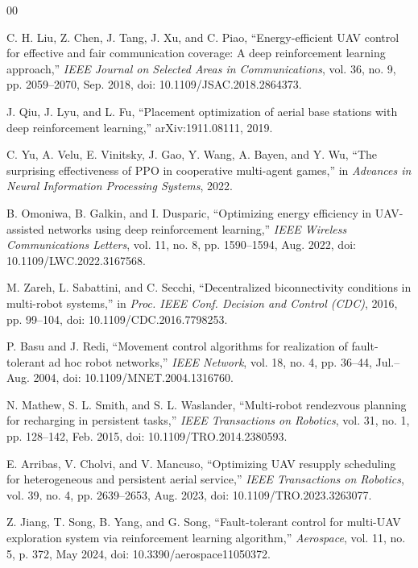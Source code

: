 \documentclass[conference]{IEEEtran}
\begin{document}
\begin{thebibliography}{00}

C. H. Liu, Z. Chen, J. Tang, J. Xu, and C. Piao, ``Energy-efficient UAV control for effective and fair communication coverage: A deep reinforcement learning approach,'' \emph{IEEE Journal on Selected Areas in Communications}, vol. 36, no. 9, pp. 2059--2070, Sep. 2018, doi: 10.1109/JSAC.2018.2864373.

J. Qiu, J. Lyu, and L. Fu, ``Placement optimization of aerial base stations with deep reinforcement learning,'' arXiv:1911.08111, 2019.

C. Yu, A. Velu, E. Vinitsky, J. Gao, Y. Wang, A. Bayen, and Y. Wu, ``The surprising effectiveness of PPO in cooperative multi-agent games,'' in \emph{Advances in Neural Information Processing Systems}, 2022.

B. Omoniwa, B. Galkin, and I. Dusparic, ``Optimizing energy efficiency in UAV-assisted networks using deep reinforcement learning,'' \emph{IEEE Wireless Communications Letters}, vol. 11, no. 8, pp. 1590--1594, Aug. 2022, doi: 10.1109/LWC.2022.3167568.

M. Zareh, L. Sabattini, and C. Secchi, ``Decentralized biconnectivity conditions in multi-robot systems,'' in \emph{Proc. IEEE Conf. Decision and Control (CDC)}, 2016, pp. 99--104, doi: 10.1109/CDC.2016.7798253.

P. Basu and J. Redi, ``Movement control algorithms for realization of fault-tolerant ad hoc robot networks,'' \emph{IEEE Network}, vol. 18, no. 4, pp. 36--44, Jul.--Aug. 2004, doi: 10.1109/MNET.2004.1316760.

N. Mathew, S. L. Smith, and S. L. Waslander, ``Multi-robot rendezvous planning for recharging in persistent tasks,'' \emph{IEEE Transactions on Robotics}, vol. 31, no. 1, pp. 128--142, Feb. 2015, doi: 10.1109/TRO.2014.2380593.

E. Arribas, V. Cholvi, and V. Mancuso, ``Optimizing UAV resupply scheduling for heterogeneous and persistent aerial service,'' \emph{IEEE Transactions on Robotics}, vol. 39, no. 4, pp. 2639--2653, Aug. 2023, doi: 10.1109/TRO.2023.3263077.

Z. Jiang, T. Song, B. Yang, and G. Song, ``Fault-tolerant control for multi-UAV exploration system via reinforcement learning algorithm,'' \emph{Aerospace}, vol. 11, no. 5, p. 372, May 2024, doi: 10.3390/aerospace11050372.


\end{thebibliography}
\end{document}

